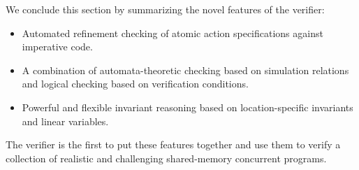 We conclude this section by summarizing the novel features of the \civl verifier:
\begin{itemize}
\item Automated refinement checking of atomic action specifications against imperative code.
\item A combination of automata-theoretic checking based on simulation relations and logical checking based on verification conditions.
\item Powerful and flexible invariant reasoning based on location-specific invariants and linear variables.
\end{itemize}
The \civl verifier is the first to put these features together and use them to verify a collection of realistic and challenging shared-memory
concurrent programs.
